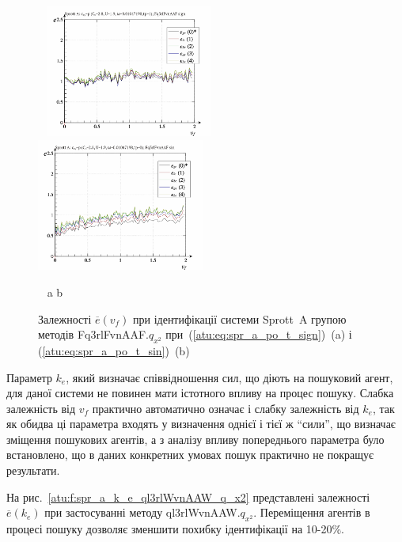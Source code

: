 \begin{figure}[htb!]
\begin{center}
  ~ \hfill
    \includegraphics[width=0.49\textwidth]{p/cha/spr_a/Fq3rlFvnAAF_x2/sprott_a_id-p_v_f_sign.png}
    \hfill
    \includegraphics[width=0.49\textwidth]{p/cha/spr_a/Fq3rlFvnAAF_x2/sprott_a_id-p_v_f_sin.png}
  \hfill ~
\end{center}
\vspace{-1.5ex}
\begin{center}
  ~ \hfill a \hfill\hfill b \hfill ~
\end{center}
\vspace{-2.5ex}
  \caption{Залежності $\overline{e}(v_f)$ при ідентифікації системи Sprott~A групою методів Fq3rlFvnAAF.$q_{x^2}$ при~(\ref{atu:eq:spr_a_po_t_sign})~(a) і (\ref{atu:eq:spr_a_po_t_sin})~(b)}
  \label{atu:f:spr_a_v_f_Fq3rlFvnAAF_q_x2}
\end{figure}

Параметр
$k_e$, який визначає співвідношення сил, що діють на пошуковий
агент, для даної системи не повинен мати істотного впливу на
процес пошуку. Слабка залежність від
$v_f$ практично автоматично означає і слабку залежність від
$k_e$, так як обидва ці параметра входять у визначення однієї
і тієї ж ``сили'', що визначає зміщення пошукових агентів, а з
аналізу впливу попереднього параметра було встановлено, що в
даних конкретних умовах пошук практично не покращує результати.


На рис.~\ref{atu:f:spr_a_k_e_ql3rlWvnAAW_q_x2} представлені залежності
$\overline{e} (k_e)$ при застосуванні методу ql3rlWvnAAW.$q_{x^2}$. Переміщення агентів в процесі пошуку дозволяє зменшити
похибку ідентифікації на 10-20\%.

